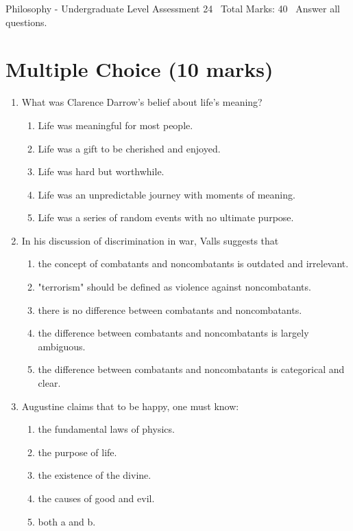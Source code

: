 \documentclass[12pt]{article}
\begin{document}
\begin{center}
Philosophy - Undergraduate Level Assessment 24 \
Total Marks: 40 \
Answer all questions.
\end{center}

\section*{Multiple Choice (10 marks)}
\begin{enumerate}[label=\arabic*.]
\item What was Clarence Darrow's belief about life's meaning?
\begin{enumerate}[label=(\alph*)]
    \item Life was meaningful for most people.
    \item Life was a gift to be cherished and enjoyed.
    \item Life was hard but worthwhile.
    \item Life was an unpredictable journey with moments of meaning.
    \item Life was a series of random events with no ultimate purpose.
\end{enumerate}
\item In his discussion of discrimination in war, Valls suggests that
\begin{enumerate}[label=(\alph*)]
    \item the concept of combatants and noncombatants is outdated and irrelevant.
    \item "terrorism" should be defined as violence against noncombatants.
    \item there is no difference between combatants and noncombatants.
    \item the difference between combatants and noncombatants is largely ambiguous.
    \item the difference between combatants and noncombatants is categorical and clear.
\end{enumerate}
\item Augustine claims that to be happy, one must know:
\begin{enumerate}[label=(\alph*)]
    \item the fundamental laws of physics.
    \item the purpose of life.
    \item the existence of the divine.
    \item the causes of good and evil.
    \item both a and b.

\end{enumerate}
\end{enumerate}
\end{document}
